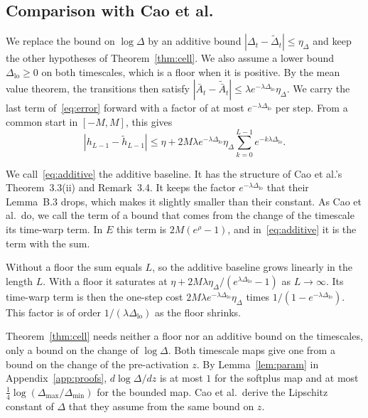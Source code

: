 \documentclass[11pt, a4paper]{article}
\theoremstyle{remark}
\theoremstyle{plain}
\newcommand{\Abar}{\bar{A}}
\begin{document}
\subsection{Comparison with Cao et al.}
\label{sec:compare}

We replace the bound on $\log\Delta$ by an additive bound
$|\Delta_t - \tilde\Delta_t| \le \eta_\Delta$ and keep the other hypotheses of
Theorem~\ref{thm:cell}. We also assume a lower bound $\Delta_{\mathrm{lo}} \ge 0$ on both
timescales, which is a floor when it is positive. By the mean value theorem, the transitions then
satisfy $|\Abar_t - \tilde{\Abar}_t| \le \lambda e^{-\lambda\Delta_{\mathrm{lo}}}\eta_\Delta$. We
carry the last term of~\eqref{eq:error} forward with a factor of at most
$e^{-\lambda\Delta_{\mathrm{lo}}}$ per step. From a common start in $[-M, M]$, this gives
\begin{equation}
\label{eq:additive}
  |h_{L-1} - \tilde h_{L-1}| \le \eta + 2M\lambda e^{-\lambda\Delta_{\mathrm{lo}}}\eta_\Delta
    \sum_{k=0}^{L-1} e^{-k\lambda\Delta_{\mathrm{lo}}} .
\end{equation}

We call~\eqref{eq:additive} the additive baseline. It has the structure of Cao et al.'s
Theorem~3.3(ii) and Remark~3.4. It keeps the factor $e^{-\lambda\Delta_{\mathrm{lo}}}$ that their
Lemma~B.3 drops, which makes it slightly smaller than their constant. As Cao et al.\ do, we call
the term of a bound that comes from the change of the timescale its time-warp term. In $E$ this
term is $2M(e^{\rho} - 1)$, and in~\eqref{eq:additive} it is the term with the sum.

Without a floor the sum equals $L$, so the additive baseline grows linearly in the length $L$.
With a floor it saturates at $\eta + 2M\lambda\eta_\Delta/(e^{\lambda\Delta_{\mathrm{lo}}} - 1)$ as
$L \to \infty$. Its time-warp term is then the one-step cost
$2M\lambda e^{-\lambda\Delta_{\mathrm{lo}}}\eta_\Delta$ times
$1/(1 - e^{-\lambda\Delta_{\mathrm{lo}}})$. This factor is of order
$1/(\lambda\Delta_{\mathrm{lo}})$ as the floor shrinks.

Theorem~\ref{thm:cell} needs neither a floor nor an additive bound on the timescales, only a bound
on the change of $\log\Delta$. Both timescale maps give one from a bound on the change of the
pre-activation $z$. By Lemma~\ref{lem:param} in Appendix~\ref{app:proofs}, $d\log\Delta/dz$ is at
most $1$ for the softplus map
and at most $\tfrac14\log(\Delta_{\max}/\Delta_{\min})$ for the bounded map. Cao et al.\ derive the
Lipschitz constant of $\Delta$ that they assume from the same bound on $z$.
\end{document}
